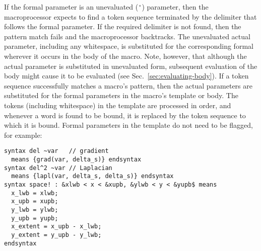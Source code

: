 \documentclass[12pt]{article}
\begin{document}
If the formal parameter is an unevaluated (\verb+'+) parameter, then the macroprocessor expects to find a token sequence terminated by the delimiter that follows the formal parameter. If the required delimiter is not found, then the pattern match fails and the macroprocessor backtracks. The unevaluated actual parameter, including any whitespace, is substituted for the corresponding formal wherever it occurs in the body of the macro. Note, however, that although the actual parameter is substituted in unevaluated form, subsequent evaluation of the body might cause it to be evaluated
(see Sec.\ \ref{sec:evaluating-body}).
If a token sequence successfully matches a macro's pattern, then the actual parameters are substituted for the formal parameters in the macro's template or body.
The tokens (including whitespace) in the template are processed in order, and whenever a word is found to be bound, it is replaced by the token sequence to which it is bound.
Formal parameters in the template do not need to be flagged, for example:
\begin{lstlisting}[frame=single]
syntax del ~var   // gradient
  means {grad(var, delta_s)} endsyntax
syntax del^2 ~var // Laplacian
  means {lapl(var, delta_s, delta_s)} endsyntax
syntax space! : &xlwb < x < &xupb, &ylwb < y < &yupb$ means
  x_lwb = xlwb;
  x_upb = xupb;
  y_lwb = ylwb;
  y_upb = yupb;
  x_extent = x_upb - x_lwb;
  y_extent = y_upb - y_lwb;
endsyntax
\end{lstlisting}
\end{document}
